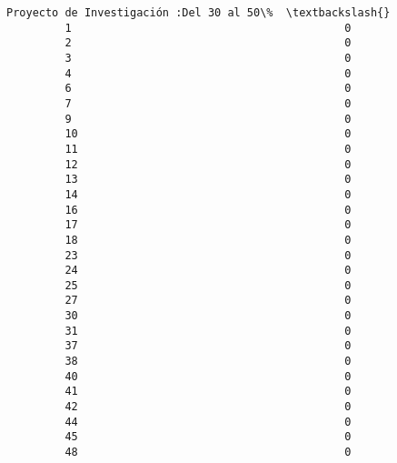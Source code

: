 \documentclass[11pt]{article}
\begin{document}
\begin{Verbatim}[commandchars=\\\{\}]
             Proyecto de Investigación :Del 30 al 50\%  \textbackslash{}
         1                                          0   
         2                                          0   
         3                                          0   
         4                                          0   
         6                                          0   
         7                                          0   
         9                                          0   
         10                                         0   
         11                                         0   
         12                                         0   
         13                                         0   
         14                                         0   
         16                                         0   
         17                                         0   
         18                                         0   
         23                                         0   
         24                                         0   
         25                                         0   
         27                                         0   
         30                                         0   
         31                                         0   
         37                                         0   
         38                                         0   
         40                                         0   
         41                                         0   
         42                                         0   
         44                                         0   
         45                                         0   
         48                                         0   
         

\end{Verbatim}
\end{document}
